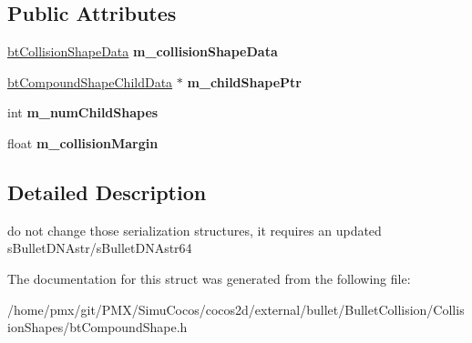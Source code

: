 \subsection*{Public Attributes}
\begin{DoxyCompactItemize}
\item 
\mbox{\label{structbtCompoundShapeData_a8ad17d74bf8a782b81387b70b0d24d62}} 
\hyperlink{structbtCollisionShapeData}{bt\+Collision\+Shape\+Data} {\bfseries m\+\_\+collision\+Shape\+Data}
\item 
\mbox{\label{structbtCompoundShapeData_a05245205b9ecc07e0946bfe1fc8d2705}} 
\hyperlink{structbtCompoundShapeChildData}{bt\+Compound\+Shape\+Child\+Data} $\ast$ {\bfseries m\+\_\+child\+Shape\+Ptr}
\item 
\mbox{\label{structbtCompoundShapeData_a363722a976d98e3090af2b59b5d74d90}} 
int {\bfseries m\+\_\+num\+Child\+Shapes}
\item 
\mbox{\label{structbtCompoundShapeData_aaa3fbc2ba9a89901f72a354e6256805b}} 
float {\bfseries m\+\_\+collision\+Margin}
\end{DoxyCompactItemize}


\subsection{Detailed Description}
do not change those serialization structures, it requires an updated s\+Bullet\+D\+N\+Astr/s\+Bullet\+D\+N\+Astr64 

The documentation for this struct was generated from the following file\+:\begin{DoxyCompactItemize}
\item 
/home/pmx/git/\+P\+M\+X/\+Simu\+Cocos/cocos2d/external/bullet/\+Bullet\+Collision/\+Collision\+Shapes/bt\+Compound\+Shape.\+h\end{DoxyCompactItemize}
